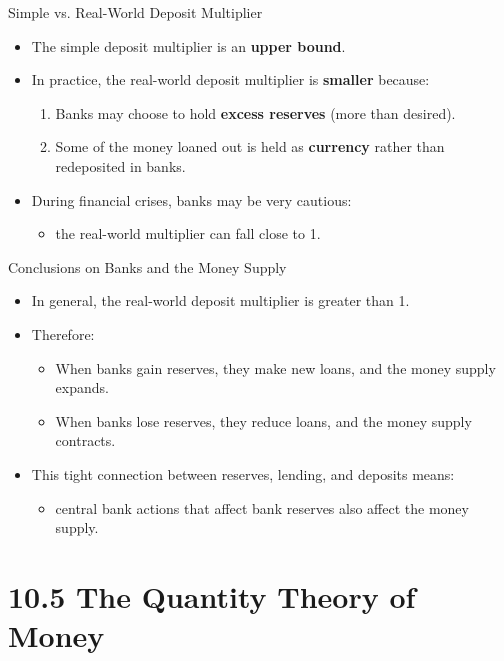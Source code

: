 \documentclass[aspectratio=169]{beamer}
\begin{document}
\begin{frame}{Simple vs. Real-World Deposit Multiplier}
\transfade
\begin{itemize}
  \item The simple deposit multiplier is an \textbf{upper bound}.
  \item In practice, the real-world deposit multiplier is \textbf{smaller} because:
  \begin{enumerate}
    \item Banks may choose to hold \textbf{excess reserves} (more than desired).
    \item Some of the money loaned out is held as \textbf{currency} rather than redeposited in banks.
  \end{enumerate}
  \item During financial crises, banks may be very cautious:
  \begin{itemize}
    \item the real-world multiplier can fall close to 1.
  \end{itemize}
\end{itemize}
\end{frame}

\begin{frame}{Conclusions on Banks and the Money Supply}
\transfade
\begin{itemize}
  \item In general, the real-world deposit multiplier is greater than 1.
  \item Therefore:
  \begin{itemize}
    \item When banks gain reserves, they make new loans, and the money supply \alert{expands}.
    \item When banks lose reserves, they reduce loans, and the money supply \alert{contracts}.
  \end{itemize}
  \item This tight connection between reserves, lending, and deposits means:
  \begin{itemize}
    \item central bank actions that affect bank reserves also affect the money supply.
  \end{itemize}
\end{itemize}
\end{frame}

\section{10.5 The Quantity Theory of Money}
\end{document}
